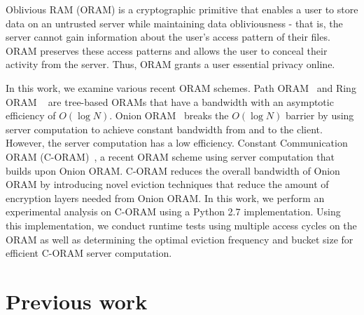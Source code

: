 \documentclass[12pt, oneside]{article}   	%
\begin{document}
Oblivious RAM (ORAM) is a cryptographic primitive that enables a user to store data on an untrusted server while maintaining data obliviousness - that is, the server cannot gain information about the user's access pattern of their files. ORAM preserves these access patterns and allows the user to conceal their activity from the server. Thus, ORAM grants a user essential privacy online.%


In this work, we examine various recent ORAM schemes. Path ORAM~\cite{PathORAM} and Ring ORAM ~\cite{RingORAM} are tree-based ORAMs that have a bandwidth with an asymptotic efficiency of $O (\log N )$. Onion ORAM~\cite{OnionORAM} breaks the $O (\log N )$ barrier by using server computation to achieve constant bandwidth from and to the client. However, the server computation has a low efficiency. Constant Communication ORAM (C-ORAM)~\cite{C-ORAM}, a recent ORAM scheme using server computation that builds upon Onion ORAM. C-ORAM reduces the overall bandwidth of Onion ORAM by introducing novel eviction techniques that reduce the amount of encryption layers needed from Onion ORAM. In this work, we perform an experimental analysis on C-ORAM using a Python 2.7 implementation. Using this implementation, we conduct runtime tests using multiple access cycles on the ORAM as well as determining the optimal eviction frequency and bucket size for efficient C-ORAM server computation.



\section{Previous work}
\end{document}
